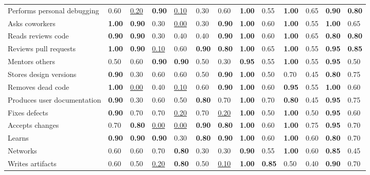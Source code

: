 \begin{tabular}{lllllllllllll}
Performs personal debugging & 0.60 & \underline{0.20} & \textbf{0.90} & \underline{0.10} & 0.30 & 0.60 & \textbf{1.00} & 0.55 & \textbf{1.00} & 0.65 & \textbf{0.90} & \textbf{0.80} \\
Asks coworkers & \textbf{1.00} & \textbf{0.90} & 0.30 & \underline{0.00} & 0.30 & \textbf{0.90} & \textbf{1.00} & 0.60 & \textbf{1.00} & 0.55 & \textbf{1.00} & 0.65 \\
Reads reviews code & \textbf{0.90} & \textbf{0.90} & 0.30 & 0.40 & 0.40 & \textbf{0.90} & \textbf{1.00} & 0.60 & \textbf{1.00} & 0.65 & \textbf{0.80} & \textbf{0.80} \\
Reviews pull requests & \textbf{1.00} & \textbf{0.90} & \underline{0.10} & 0.60 & \textbf{0.90} & \textbf{0.80} & \textbf{1.00} & 0.65 & \textbf{1.00} & 0.55 & \textbf{0.95} & \textbf{0.85} \\
Mentors others & 0.50 & 0.60 & \textbf{0.90} & \textbf{0.90} & 0.50 & 0.30 & \textbf{0.95} & 0.55 & \textbf{1.00} & 0.55 & \textbf{0.95} & 0.50 \\
Stores design versions & \textbf{0.90} & 0.30 & 0.60 & 0.60 & 0.50 & \textbf{0.90} & \textbf{1.00} & 0.50 & 0.70 & 0.45 & \textbf{0.80} & 0.75 \\
Removes dead code & \textbf{1.00} & \underline{0.00} & 0.40 & \underline{0.10} & 0.60 & \textbf{0.90} & \textbf{1.00} & 0.60 & \textbf{0.95} & 0.55 & \textbf{1.00} & 0.60 \\
Produces user documentation & \textbf{0.90} & 0.30 & 0.60 & 0.50 & \textbf{0.80} & 0.70 & \textbf{1.00} & 0.70 & \textbf{0.80} & 0.45 & \textbf{0.95} & 0.75 \\
Fixes defects & \textbf{0.90} & 0.70 & 0.70 & \underline{0.20} & 0.70 & \underline{0.20} & \textbf{1.00} & 0.50 & \textbf{1.00} & 0.50 & \textbf{0.95} & 0.60 \\
Accepts changes & 0.70 & \textbf{0.80} & \underline{0.00} & \underline{0.00} & \textbf{0.90} & \textbf{0.80} & \textbf{1.00} & 0.60 & \textbf{1.00} & 0.75 & \textbf{0.95} & 0.70 \\
Learns & \textbf{0.90} & \textbf{0.90} & \textbf{0.90} & 0.30 & \textbf{0.80} & \textbf{0.90} & \textbf{1.00} & 0.60 & \textbf{1.00} & 0.60 & \textbf{0.80} & 0.70 \\
Networks & 0.60 & 0.60 & 0.70 & \textbf{0.80} & 0.30 & 0.30 & \textbf{0.90} & 0.55 & \textbf{1.00} & 0.60 & \textbf{0.85} & 0.45 \\
Writes artifacts & 0.60 & 0.50 & \underline{0.20} & \textbf{0.80} & 0.50 & \underline{0.10} & \textbf{1.00} & \textbf{0.85} & 0.50 & 0.40 & \textbf{0.90} & 0.70 \\

\end{tabular}

